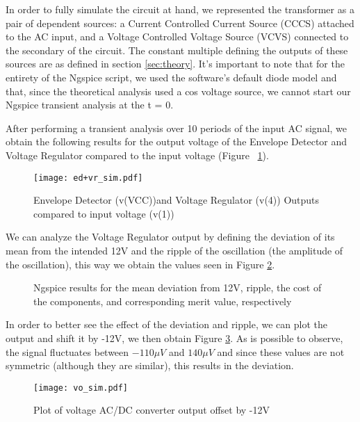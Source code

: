 \hspace{12pt} In order to fully simulate the circuit at hand, we represented the transformer as a pair of dependent sources: a Current Controlled Current Source (CCCS) attached to the AC input, and a Voltage Controlled Voltage Source (VCVS) connected to the secondary of the circuit. The constant multiple defining the outputs of these sources are as defined in section \ref{sec:theory}. It's important to note that for the entirety of the Ngspice script, we used the software's default diode model and that, since the theoretical analysis used a cos voltage source, we cannot start our Ngspice transient analysis at the t = 0.

After performing a transient analysis over 10 periods of the input AC signal, we obtain the following results for the output voltage of the Envelope Detector and Voltage Regulator compared to the input voltage (Figure ~\ref{fig:ed_vr}).

\begin{figure}[h]
	\centering
        \texttt{[image: ed+vr\_sim.pdf]}
        \caption{Envelope Detector (v(VCC))and Voltage Regulator (v(4)) Outputs compared to input voltage (v(1))}
        \label{fig:ed_vr}
\end{figure}

We can analyze the Voltage Regulator output by defining the deviation of its mean from the intended 12V and the ripple of the oscillation (the amplitude of the oscillation), this way we obtain the values seen in Figure \ref{fig:sim_results}.

\begin{figure}[h]
	\centering
	\caption{Ngspice results for the mean deviation from 12V, ripple, the cost of the components, and corresponding merit value, respectively}
	\label{fig:sim_results}
\end{figure}

\pagebreak
In order to better see the effect of the deviation and ripple, we can plot the output and shift it by -12V, we then obtain Figure \ref{fig:sim_vo}. As is possible to observe, the signal fluctuates between $-110 \mu V$ and $140 \mu V$ and since these values are not symmetric (although they are similar), this results in the deviation.

\begin{figure}[h]
	\centering
	\texttt{[image: vo\_sim.pdf]}
	\caption{Plot of voltage AC/DC converter output offset by -12V}
	\label{fig:sim_vo}
\end{figure}

